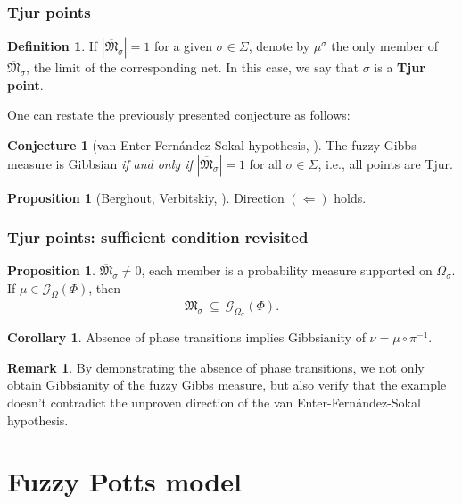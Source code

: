 \documentclass{beamer}
\newcommand{\G}{\mathcal{G}}
\newcommand{\MM}{\overline{\mathfrak{M}}}
\newcommand{\1}{\mathbbm{1}}
\newcommand{\5}{\vspace{0.5cm}}
\newcommand{\3}{\vspace{0.3cm}}
\theoremstyle{definition}
\newtheorem{prop}[thm]{Proposition}
\newtheorem{df}[thm]{Definition}
\newtheorem{rem}[thm]{Remark}
\newtheorem{cor}{Corollary}
\newtheorem*{conj}{Conjecture}
\begin{document}
\begin{frame}
\frametitle{Tjur points}
\begin{df}
If $|\MM_\sigma|=1$ for a given $\sigma\in\Sigma$, denote by $\mu^\sigma$ the only member of $\MM_\sigma$, the limit of the corresponding net. In this case, we say that $\sigma$ is a \textbf{Tjur point}.\pause
\end{df}\vspace{0.3cm}
One can restate the previously presented conjecture as follows:\pause
\begin{conj}[van Enter-Fern\'andez-Sokal hypothesis, \cite{Ber}]
The fuzzy Gibbs measure is Gibbsian \textit{if and only if} $|\MM_\sigma|=1$ for all $\sigma\in\Sigma$, i.e., all points are Tjur.
\end{conj}\vspace{0.3cm}\pause
\begin{prop}[Berghout, Verbitskiy, \cite{Ber}]
Direction $(\Leftarrow)$ holds.
\end{prop}
\end{frame}

\begin{frame}
\frametitle{Tjur points: sufficient condition revisited}
\begin{prop}
$\MM_\sigma\neq 0$, each member is a probability measure supported on $\Omega_\sigma$. If $\mu\in\G_\Omega(\Phi)$, then 
$$\MM_\sigma ~\subseteq~ \G_{\Omega_\sigma}(\Phi).$$
\end{prop}\vspace{0.2cm}\pause
\begin{cor}
Absence of phase transitions implies Gibbsianity of $\nu=\mu\circ\pi^{-1}$.
\end{cor}\vspace*{0.2cm}\pause
\begin{rem}
By demonstrating the absence of phase transitions, we not only obtain Gibbsianity of the fuzzy Gibbs measure, but also verify that the example doesn't contradict the unproven direction of the van Enter-Fern\'andez-Sokal hypothesis.
\end{rem}
\end{frame}


\section{Fuzzy Potts model}
\end{document}
